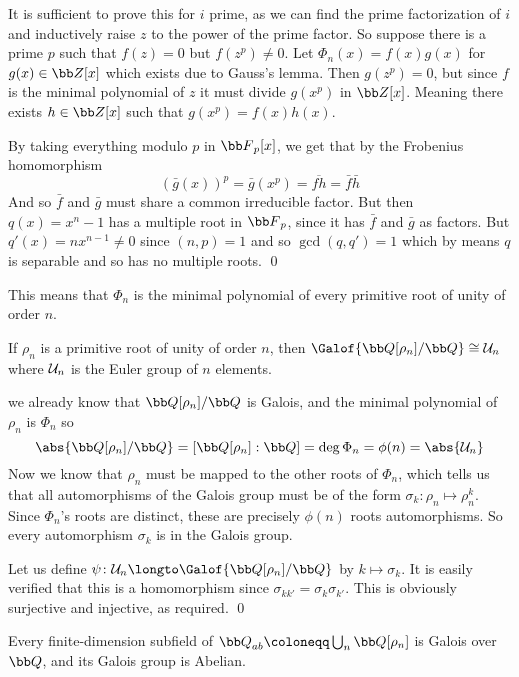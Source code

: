 It is sufficient to prove this for $i$ prime, as we can find the prime factorization of $i$ and inductively raise $z$ to the power of the prime factor.
So suppose there is a prime $p$ such that $f(z)=0$ but $f(z^p)\neq0$.
Let $\Phi_n(x)=f(x)g(x)$ for $g(x)\in{\bb Z}[x]$ which exists due to Gauss's lemma.
Then $g(z^p)=0$, but since $f$ is the minimal polynomial of $z$ it must divide $g(x^p)$ in ${\bb Z}[x]$.
Meaning there exists $h\in{\bb Z}[x]$ such that $g(x^p)=f(x)h(x)$.

By taking everything modulo $p$ in ${\bb F}_p[x]$, we get that by the Frobenius homomorphism
$$ (\bar g(x))^p = \bar g(x^p) = \overline{fh} = \bar f\bar h $$
And so $\bar f$ and $\bar g$ must share a common irreducible factor.
But then $q(x)=x^n-1$ has a multiple root in ${\bb F}_p$, since it has $\bar f$ and $\bar g$ as factors.
But $q'(x)=nx^{n-1}\neq0$ since $(n,p)=1$ and so $\gcd(q,q')=1$ which by  means $q$ is separable and so has no multiple roots.
\qed

This means that $\Phi_n$ is the minimal polynomial of every primitive root of unity of order $n$.

\bcoro

    If $\rho_n$ is a primitive root of unity of order $n$, then $\Galof{{\bb Q}[\rho_n]/{\bb Q}}\cong{\cal U}_n$ where ${\cal U}_n$ is the Euler group of $n$ elements.

\ecoro

\Proof we already know that ${\bb Q}[\rho_n]/{\bb Q}$ is Galois, and the minimal polynomial of $\rho_n$ is $\Phi_n$ so
$$ \abs{{\bb Q}[\rho_n]/{\bb Q}} = [{\bb Q}[\rho_n] : {\bb Q}] = \deg\Phi_n = \phi(n) = \abs{{\cal U}_n} $$
Now we know that $\rho_n$ must be mapped to the other roots of $\Phi_n$, which tells us that all automorphisms of the Galois group must be of the form $\sigma_k\colon\rho_n\mapsto\rho_n^k$.
Since $\Phi_n$'s roots are distinct, these are precisely $\phi(n)$ roots automorphisms.
So every automorphism $\sigma_k$ is in the Galois group.

Let us define $\psi\colon{\cal U}_n\longto\Galof{{\bb Q}[\rho_n]/{\bb Q}}$ by $k\mapsto\sigma_k$.
It is easily verified that this is a homomorphism since $\sigma_{kk'}=\sigma_k\sigma_{k'}$.
This is obviously surjective and injective, as required.
\qed

\bcoro

    Every finite-dimension subfield of ${\bb Q}_{ab}\coloneqq\bigcup_n{\bb Q}[\rho_n]$ is Galois over ${\bb Q}$, and its Galois group is Abelian.

